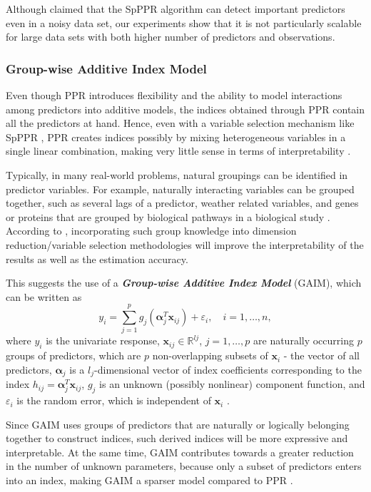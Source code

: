 \documentclass[11pt,a4paper,]{article}
\begin{document}
Although \textcite{Zhang2008} claimed that the SpPPR algorithm can
detect important predictors even in a noisy data set, our experiments
show that it is not particularly scalable for large data sets with both
higher number of predictors and observations.

\hypertarget{group-wise-additive-index-model}{%
\subsubsection{Group-wise Additive Index
Model}\label{group-wise-additive-index-model}}

Even though PPR introduces flexibility and the ability to model
interactions among predictors into additive models, the indices obtained
through PPR contain all the predictors at hand. Hence, even with a
variable selection mechanism like SpPPR \autocite{Zhang2008}, PPR
creates indices possibly by mixing heterogeneous variables in a single
linear combination, making very little sense in terms of
interpretability \autocite{Masselot2022}.

Typically, in many real-world problems, natural groupings can be
identified in predictor variables. For example, naturally interacting
variables can be grouped together, such as several lags of a predictor,
weather related variables, and genes or proteins that are grouped by
biological pathways in a biological study
\autocite{Masselot2022,Wang2015}. According to \textcite{Wang2015},
incorporating such group knowledge into dimension reduction/variable
selection methodologies will improve the interpretability of the results
as well as the estimation accuracy.

This suggests the use of a \textbf{\emph{Group-wise Additive Index
Model}} (GAIM), which can be written as \[
  y_{i} = \sum_{j = 1}^{p} g_{j}(\bm{\alpha}_{j}^{T}\bm{x}_{ij}) + \varepsilon_{i}, \quad i = 1, \dots, n, 
\] where \(y_{i}\) is the univariate response,
\(\bm{x}_{ij} \in \mathbb{R}^{l{j}}\), \(j = 1, \dots, p\) are naturally
occurring \(p\) groups of predictors, which are \(p\) non-overlapping
subsets of \(\bm{x}_{i}\) - the vector of all predictors,
\(\bm{\alpha}_{j}\) is a \(l_{j}\)-dimensional vector of index
coefficients corresponding to the index
\(h_{ij} = \bm{\alpha}_{j}^{T}\bm{x}_{ij}\), \(g_{j}\) is an unknown
(possibly nonlinear) component function, and \(\varepsilon_{i}\) is the
random error, which is independent of \(\bm{x}_{i}\)
\autocite{Wang2015-mp,Masselot2022}.

Since GAIM uses groups of predictors that are naturally or logically
belonging together to construct indices, such derived indices will be
more expressive and interpretable. At the same time, GAIM contributes
towards a greater reduction in the number of unknown parameters, because
only a subset of predictors enters into an index, making GAIM a sparser
model compared to PPR \autocite{Wang2015-mp,Masselot2022}.
\end{document}
